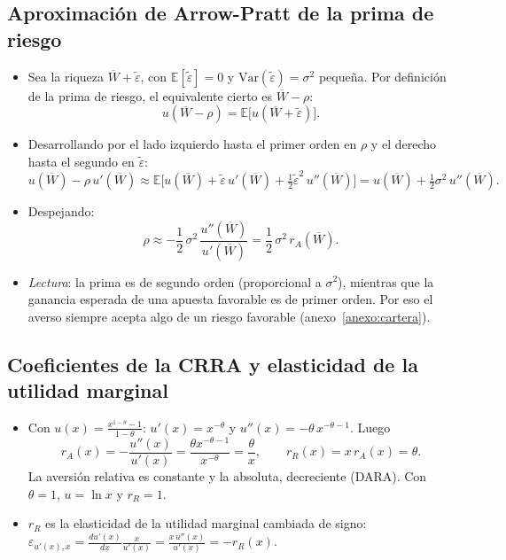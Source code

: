 \documentclass[11pt]{article}
\begin{document}
\subsection{Aproximación de Arrow-Pratt de la prima de riesgo}\label{anexo:arrow-pratt}

\begin{itemize}
\item Sea la riqueza $\overline{W}+\tilde{\varepsilon}$, con $\mathbb{E}[\tilde{\varepsilon}]=0$ y $\mathrm{Var}(\tilde{\varepsilon})=\sigma^2$ pequeña. Por definición de la prima de riesgo, el equivalente cierto es $\overline{W}-\rho$:
  $$u(\overline{W}-\rho)=\mathbb{E}\big[u(\overline{W}+\tilde{\varepsilon})\big].$$
\item Desarrollando por  el lado izquierdo hasta el primer orden en $\rho$ y el derecho hasta el segundo en $\tilde{\varepsilon}$:
  $$u(\overline{W})-\rho\,u'(\overline{W})\approx\mathbb{E}\Big[u(\overline{W})+\tilde{\varepsilon}\,u'(\overline{W})+\tfrac12\tilde{\varepsilon}^2\,u''(\overline{W})\Big]=u(\overline{W})+\tfrac12\sigma^2\,u''(\overline{W}).$$
\item Despejando:
  $$\rho\approx-\frac12\,\sigma^2\,\frac{u''(\overline{W})}{u'(\overline{W})}=\frac12\,\sigma^2\,r_A(\overline{W}).$$
  \findemo
\item \emph{Lectura}: la prima es de segundo orden (proporcional a $\sigma^2$), mientras que la ganancia esperada de una apuesta favorable es de primer orden. Por eso el averso siempre acepta algo de un riesgo favorable (anexo~\ref{anexo:cartera}).
\end{itemize}

\subsection{Coeficientes de la CRRA y elasticidad de la utilidad marginal}\label{anexo:crra}

\begin{itemize}
\item Con $u(x)=\frac{x^{1-\theta}-1}{1-\theta}$: $u'(x)=x^{-\theta}$ y $u''(x)=-\theta\,x^{-\theta-1}$. Luego
  $$r_A(x)=-\frac{u''(x)}{u'(x)}=\frac{\theta x^{-\theta-1}}{x^{-\theta}}=\frac{\theta}{x},\qquad r_R(x)=x\,r_A(x)=\theta .$$
  La aversión relativa es constante y la absoluta, decreciente (DARA). Con $\theta=1$, $u=\ln x$ y $r_R=1$. \findemo
\item $r_R$ es la elasticidad de la utilidad marginal cambiada de signo: $\varepsilon_{u'(x),x}=\frac{du'(x)}{dx}\frac{x}{u'(x)}=\frac{x\,u''(x)}{u'(x)}=-r_R(x)$.
\end{itemize}
\end{document}
